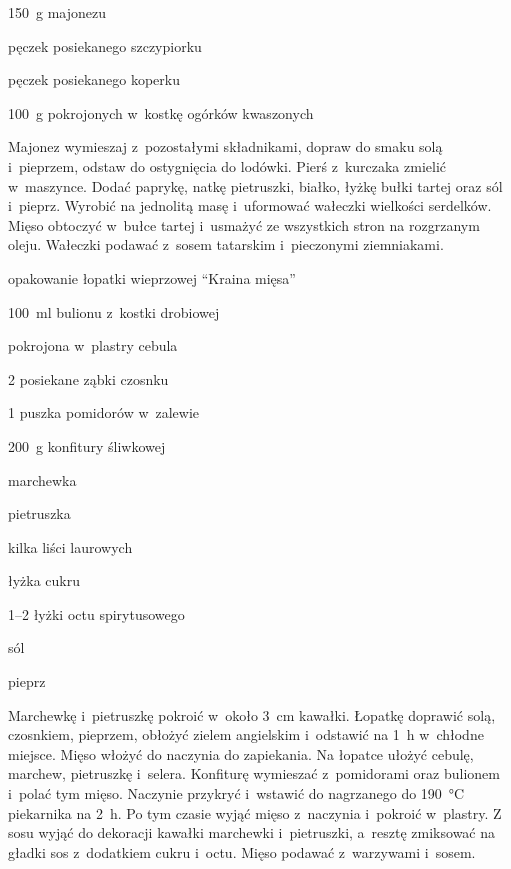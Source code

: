 \documentclass[../kucharek.tex]{subfiles}
\begin{document}
\begin{Ingred}
    \item \qty{150}{\gram} majonezu
    \item pęczek posiekanego szczypiorku
    \item pęczek posiekanego koperku
    \item \qty{100}{\gram} pokrojonych w~kostkę ogórków kwaszonych
\end{Ingred}

 Majonez wymieszaj z~pozostałymi składnikami, dopraw do smaku
solą i~pieprzem, odstaw do ostygnięcia do lodówki.
 Pierś z~kurczaka zmielić w~maszynce. Dodać paprykę, natkę
pietruszki, białko, łyżkę bułki tartej oraz sól i~pieprz. Wyrobić na jednolitą
masę i~uformować wałeczki wielkości serdelków. Mięso obtoczyć w~bułce tartej
i~usmażyć ze wszystkich stron na rozgrzanym oleju. Wałeczki podawać z~sosem
tatarskim i~pieczonymi ziemniakami.


\begin{Ingred}
    \item opakowanie łopatki wieprzowej \enquote{Kraina mięsa}
    \item \qty{100}{\milli\litre} bulionu z~kostki drobiowej
    \item pokrojona w~plastry cebula
    \item \num{2} posiekane ząbki czosnku
    \item \num{1} puszka pomidorów w~zalewie
    \item \qty{200}{\gram} konfitury śliwkowej
    \item marchewka
    \item pietruszka
    \item kilka liści laurowych
    \item łyżka cukru
    \item \numrange{1}{2} łyżki octu spirytusowego
    \item sól
    \item pieprz
\end{Ingred}

Marchewkę i~pietruszkę pokroić w~około \qty{3}{\centi\metre} kawałki. Łopatkę
doprawić solą, czosnkiem, pieprzem, obłożyć zielem angielskim i~odstawić na
\qty{1}{\hour} w~chłodne miejsce. Mięso włożyć do naczynia do zapiekania. Na
łopatce ułożyć cebulę, marchew, pietruszkę i~selera. Konfiturę wymieszać
z~pomidorami oraz bulionem i~polać tym mięso. Naczynie przykryć i~wstawić do
nagrzanego do \qty{190}{\celsius} piekarnika na \qty{2}{\hour}. Po tym czasie
wyjąć mięso z~naczynia i~pokroić w~plastry. Z sosu wyjąć do dekoracji kawałki
marchewki i~pietruszki, a~resztę zmiksować na gładki sos z~dodatkiem cukru
i~octu. Mięso podawać z~warzywami i~sosem.
\end{document}
